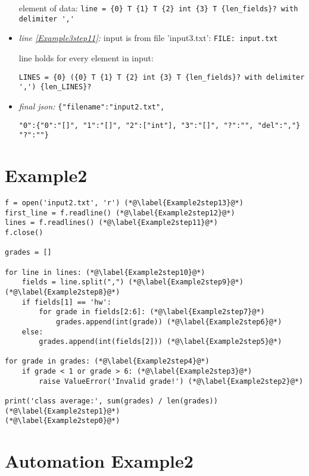 \documentclass[11pt]{article}
\begin{document}
\begin{itemize}
element of data: \verb|line = {0} T {1} T {2} int {3} T {len_fields}? with delimiter ','|

\item \textit{line \ref{Example3step11}:} input is from file 'input3.txt': \verb|FILE: input.txt|

line holds for every element in input: 

\verb|LINES = {0} ({0} T {1} T {2} int {3} T {len_fields}? with delimiter ',') {len_LINES}?|

\item \textit{final json:} \verb|{"filename":"input2.txt",|

\verb|"0":{"0":"[]", "1":"[]", "2":["int"], "3":"[]", "?":"", "del":","} "?":""}|



\end{itemize}


\section{Example2}


\begin{lstlisting}
f = open('input2.txt', 'r') (*@\label{Example2step13}@*) 
first_line = f.readline() (*@\label{Example2step12}@*) 
lines = f.readlines() (*@\label{Example2step11}@*) 
f.close()

grades = []

for line in lines: (*@\label{Example2step10}@*) 
    fields = line.split(",") (*@\label{Example2step9}@*) 
(*@\label{Example2step8}@*) 
    if fields[1] == 'hw':
        for grade in fields[2:6]: (*@\label{Example2step7}@*) 
            grades.append(int(grade)) (*@\label{Example2step6}@*) 
    else:
        grades.append(int(fields[2])) (*@\label{Example2step5}@*) 

for grade in grades: (*@\label{Example2step4}@*) 
    if grade < 1 or grade > 6: (*@\label{Example2step3}@*) 
        raise ValueError('Invalid grade!') (*@\label{Example2step2}@*) 

print('class average:', sum(grades) / len(grades)) (*@\label{Example2step1}@*) 
(*@\label{Example2step0}@*) 
\end{lstlisting}

\section{Automation Example2}
\end{document}

